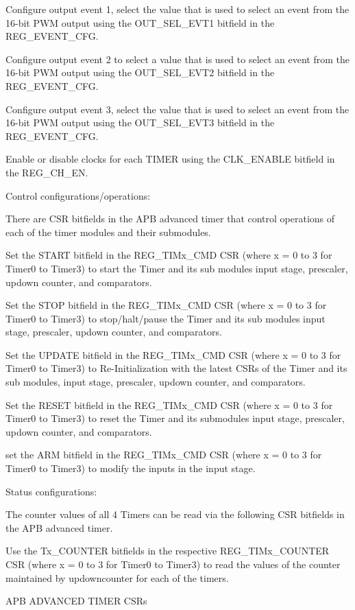     Configure output event 1, select the value that is used to select an event from the 16-bit PWM output using the OUT_SEL_EVT1 bitfield in the REG_EVENT_CFG.

    Configure output event 2 to select a value that is used to select an event from the 16-bit PWM output using the OUT_SEL_EVT2 bitfield in the REG_EVENT_CFG.

    Configure output event 3, select the value that is used to select an event from the 16-bit PWM output using the OUT_SEL_EVT3 bitfield in the REG_EVENT_CFG.

    Enable or disable clocks for each TIMER using the CLK_ENABLE bitfield in the REG_CH_EN.

Control configurations/operations:

There are CSR bitfields in the APB advanced timer that control operations of each of the timer modules and their submodules.

    Set the START bitfield in the REG_TIMx_CMD CSR (where x = 0 to 3 for Timer0 to Timer3) to start the Timer and its sub modules input stage, prescaler, updown counter, and comparators.

    Set the STOP bitfield in the REG_TIMx_CMD CSR (where x = 0 to 3 for Timer0 to Timer3) to stop/halt/pause the Timer and its sub modules input stage, prescaler, updown counter, and comparators.

    Set the UPDATE bitfield in the REG_TIMx_CMD CSR (where x = 0 to 3 for Timer0 to Timer3) to Re-Initialization with the latest CSRs of the Timer and its sub modules, input stage, prescaler, updown counter, and comparators.

    Set the RESET bitfield in the REG_TIMx_CMD CSR (where x = 0 to 3 for Timer0 to Timer3) to reset the Timer and its submodules input stage, prescaler, updown counter, and comparators.

    set the ARM bitfield in the REG_TIMx_CMD CSR (where x = 0 to 3 for Timer0 to Timer3) to modify the inputs in the input stage.

Status configurations:

The counter values of all 4 Timers can be read via the following CSR bitfields in the APB advanced timer.

    Use the Tx_COUNTER bitfields in the respective REG_TIMx_COUNTER CSR (where x = 0 to 3 for Timer0 to Timer3) to read the values of the counter maintained by updowncounter for each of the timers.

APB ADVANCED TIMER CSRs

